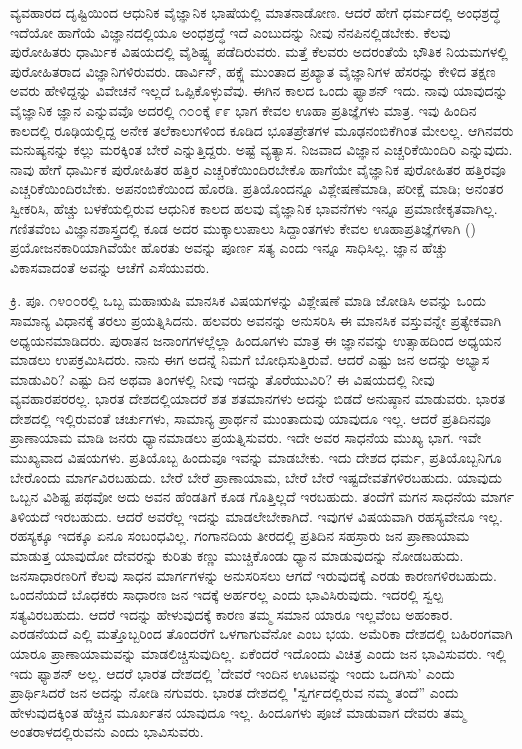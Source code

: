 ವ್ಯವಹಾರದ ದೃಷ್ಟಿಯಿಂದ ಆಧುನಿಕ ವೈಜ್ಞಾನಿಕ ಭಾಷೆಯಲ್ಲಿ ಮಾತನಾಡೋಣ. ಆದರೆ ಹೇಗೆ ಧರ್ಮದಲ್ಲಿ ಅಂಧಶ್ರದ್ಧೆ ಇದೆಯೋ ಹಾಗೆಯೆ ವಿಜ್ಞಾನದಲ್ಲಿಯೂ ಅಂಧಶ್ರದ್ಧೆ ಇದೆ ಎಂಬುದನ್ನು ನೀವು ನೆನಪಿನಲ್ಲಿಡಬೇಕು. ಕೆಲವು ಪುರೋಹಿತರು ಧಾರ್ಮಿಕ ವಿಷಯದಲ್ಲಿ ವೈಶಿಷ್ಟ್ಯ ಪಡೆದಿರುವರು. ಮತ್ತೆ ಕೆಲವರು ಅದರಂತೆಯೆ ಭೌತಿಕ ನಿಯಮಗಳಲ್ಲಿ ಪುರೋಹಿತರಾದ ವಿಜ್ಞಾನಿಗಳಿರುವರು. ಡಾರ್ವಿನ್, ಹಕ್ಸ್ಲೆ ಮುಂತಾದ ಪ್ರಖ್ಯಾತ ವೈಜ್ಞಾನಿಗಳ ಹೆಸರನ್ನು ಕೇಳಿದ ತಕ್ಷಣ ಅವರು ಹೇಳಿದ್ದನ್ನು ವಿವೇಚನೆ ಇಲ್ಲದೆ ಒಪ್ಪಿಕೊಳ್ಳುವೆವು. ಈಗಿನ ಕಾಲದ ಒಂದು ಫ್ಯಾಶನ್ ಇದು. ನಾವು ಯಾವುದನ್ನು ವೈಜ್ಞಾನಿಕ ಜ್ಞಾನ ಎನ್ನುವವೊ ಅದರಲ್ಲಿ ೧೦೦ಕ್ಕೆ ೯೯ ಭಾಗ ಕೇವಲ ಊಹಾ ಪ್ರತಿಜ್ಞೆಗಳು ಮಾತ್ರ. ಇವು ಹಿಂದಿನ ಕಾಲದಲ್ಲಿ ರೂಢಿಯಲ್ಲಿದ್ದ ಅನೇಕ ತಲೆಕಾಲುಗಳಿಂದ ಕೂಡಿದ ಭೂತಪ್ರೇತಗಳ ಮೂಢನಂಬಿಕೆಗಿಂತ ಮೇಲಲ್ಲ. ಆಗಿನವರು ಮನುಷ್ಯನನ್ನು ಕಲ್ಲು ಮರಕ್ಕಿಂತ ಬೇರೆ ಎನ್ನುತ್ತಿದ್ದರು. ಅಷ್ಟೆ ವ್ಯತ್ಯಾಸ. ನಿಜವಾದ ವಿಜ್ಞಾನ ಎಚ್ಚರಿಕೆಯಿಂದಿರಿ ಎನ್ನುವುದು. ನಾವು ಹೇಗೆ ಧಾರ್ಮಿಕ ಪುರೋಹಿತರ ಹತ್ತಿರ ಎಚ್ಚರಿಕೆಯಿಂದಿರಬೇಕೊ ಹಾಗೆಯೇ ವೈಜ್ಞಾನಿಕ ಪುರೋಹಿತರ ಹತ್ತಿರವೂ ಎಚ್ಚರಿಕೆಯಿಂದಿರಬೇಕು. ಅಪನಂಬಿಕೆಯಿಂದ ಹೊರಡಿ. ಪ್ರತಿಯೊಂದನ್ನೂ ವಿಶ್ಲೇಷಣೆಮಾಡಿ, ಪರೀಕ್ಷೆ ಮಾಡಿ; ಅನಂತರ ಸ್ವೀಕರಿಸಿ, ಹೆಚ್ಚು ಬಳಕೆಯಲ್ಲಿರುವ ಆಧುನಿಕ ಕಾಲದ ಹಲವು ವೈಜ್ಞಾನಿಕ ಭಾವನೆಗಳು ಇನ್ನೂ ಪ್ರಮಾಣೀಕೃತವಾಗಿಲ್ಲ. ಗಣಿತವೆಂಬ ವಿಜ್ಞಾನಶಾಸ್ತ್ರದಲ್ಲಿ ಕೂಡ ಅದರ ಮುಕ್ಕಾಲುಪಾಲು ಸಿದ್ದಾಂತಗಳು ಕೇವಲ ಊಹಾಪ್ರತಿಜ್ಞೆಗಳಾಗಿ () ಪ್ರಯೋಜನಕಾರಿಯಾಗಿವೆಯೇ ಹೊರತು ಅವನ್ನು ಪೂರ್ಣ ಸತ್ಯ ಎಂದು ಇನ್ನೂ ಸಾಧಿಸಿಲ್ಲ. ಜ್ಞಾನ ಹೆಚ್ಚು ವಿಕಾಸವಾದಂತೆ ಅವನ್ನು ಆಚೆಗೆ ಎಸೆಯುವರು.

ಕ್ರಿ. ಪೂ. ೧೪೦೦ರಲ್ಲಿ ಒಬ್ಬ ಮಹಾಋಷಿ ಮಾನಸಿಕ ವಿಷಯಗಳನ್ನು ವಿಶ್ಲೇಷಣೆ ಮಾಡಿ ಜೋಡಿಸಿ ಅವನ್ನು ಒಂದು ಸಾಮಾನ್ಯ ವಿಧಾನಕ್ಕೆ ತರಲು ಪ್ರಯತ್ನಿಸಿದನು. ಹಲವರು ಅವನನ್ನು ಅನುಸರಿಸಿ ಈ ಮಾನಸಿಕ ವಸ್ತುವನ್ನೇ ಪ್ರತ್ಯೇಕವಾಗಿ ಅಧ್ಯಯನಮಾಡಿದರು. ಪುರಾತನ ಜನಾಂಗಗಳಲ್ಲೆಲ್ಲಾ ಹಿಂದೂಗಳು ಮಾತ್ರ ಈ ಜ್ಞಾನವನ್ನು ಉತ್ಸಾಹದಿಂದ ಅಧ್ಯಯನ ಮಾಡಲು ಉಪಕ್ರಮಿಸಿದರು. ನಾನು ಈಗ ಅದನ್ನೆ ನಿಮಗೆ ಬೋಧಿಸುತ್ತಿರುವೆ. ಆದರೆ ಎಷ್ಟು ಜನ ಅದನ್ನು ಅಭ್ಯಾಸ ಮಾಡುವಿರಿ? ಎಷ್ಟು ದಿನ ಅಥವಾ ತಿಂಗಳಲ್ಲಿ ನೀವು ಇದನ್ನು ತೊರೆಯುವಿರಿ? ಈ ವಿಷಯದಲ್ಲಿ ನೀವು ವ್ಯವಹಾರಪರರಲ್ಲ. ಭಾರತ ದೇಶದಲ್ಲಿಯಾದರೆ ಶತ ಶತಮಾನಗಳು ಅದನ್ನು ಬಿಡದೆ ಅನುಷ್ಠಾನ ಮಾಡುವರು. ಭಾರತ ದೇಶದಲ್ಲಿ ಇಲ್ಲಿರುವಂತೆ ಚರ್ಚುಗಳು, ಸಾಮಾನ್ಯ ಪ್ರಾರ್ಥನೆ ಮುಂತಾದುವು ಯಾವುದೂ ಇಲ್ಲ. ಆದರೆ ಪ್ರತಿದಿನವೂ ಪ್ರಾಣಾಯಾಮ ಮಾಡಿ ಜನರು ಧ್ಯಾನಮಾಡಲು ಪ್ರಯತ್ನಿಸುವರು. ಇದೇ ಅವರ ಸಾಧನೆಯ ಮುಖ್ಯ ಭಾಗ. ಇವೇ ಮುಖ್ಯವಾದ ವಿಷಯಗಳು. ಪ್ರತಿಯೊಬ್ಬ ಹಿಂದುವೂ ಇವನ್ನು ಮಾಡಬೇಕು. ಇದು ದೇಶದ ಧರ್ಮ, ಪ್ರತಿಯೊಬ್ಬನಿಗೂ ಬೇರೊಂದು ಮಾರ್ಗವಿರಬಹುದು. ಬೇರೆ ಬೇರೆ ಪ್ರಾಣಾಯಾಮ, ಬೇರೆ ಬೇರೆ ಇಷ್ಟದೇವತೆಗಳಿರಬಹುದು. ಯಾವುದು ಒಬ್ಬನ ವಿಶಿಷ್ಟ ಪಥವೋ ಅದು ಅವನ ಹೆಂಡತಿಗೆ ಕೂಡ ಗೊತ್ತಿಲ್ಲದೆ ಇರಬಹುದು. ತಂದೆಗೆ ಮಗನ ಸಾಧನೆಯ ಮಾರ್ಗ ತಿಳಿಯದೆ ಇರಬಹುದು. ಆದರೆ ಅವರೆಲ್ಲ ಇದನ್ನು ಮಾಡಲೇಬೇಕಾಗಿದೆ. ಇವುಗಳ ವಿಷಯವಾಗಿ ರಹಸ್ಯವೇನೂ ಇಲ್ಲ. ರಹಸ್ಯಕ್ಕೂ ಇದಕ್ಕೂ ಏನೂ ಸಂಬಂಧವಿಲ್ಲ. ಗಂಗಾನದಿಯ ತೀರದಲ್ಲಿ ಪ್ರತಿದಿನ ಸಹಸ್ರಾರು ಜನ ಪ್ರಾಣಾಯಾಮ ಮಾಡುತ್ತ ಯಾವುದೋ ದೇವರನ್ನು ಕುರಿತು ಕಣ್ಣು ಮುಚ್ಚಿಕೊಂಡು ಧ್ಯಾನ ಮಾಡುವುದನ್ನು ನೋಡಬಹುದು. ಜನಸಾಧಾರಣರಿಗೆ ಕೆಲವು ಸಾಧನ ಮಾರ್ಗಗಳನ್ನು ಅನುಸರಿಸಲು ಆಗದೆ ಇರುವುದಕ್ಕೆ ಎರಡು ಕಾರಣಗಳಿರಬಹುದು. ಒಂದನೆಯದೆ ಬೊಧಕರು ಸಾಧಾರಣ ಜನ ಇದಕ್ಕೆ ಅರ್ಹರಲ್ಲ ಎಂದು ಭಾವಿಸಿರುವುದು. ಇದರಲ್ಲಿ ಸ್ವಲ್ಪ ಸತ್ಯವಿರಬಹುದು. ಆದರೆ ಇದನ್ನು ಹೇಳುವುದಕ್ಕೆ ಕಾರಣ ತಮ್ಮ ಸಮಾನ ಯಾರೂ ಇಲ್ಲವೆಂಬ ಅಹಂಕಾರ. ಎರಡನೆಯದೆ ಎಲ್ಲಿ ಮತ್ತೊಬ್ಬರಿಂದ ತೊಂದರೆಗೆ ಒಳಗಾಗುವೆನೋ ಎಂಬ ಭಯ. ಅಮೆರಿಕಾ ದೇಶದಲ್ಲಿ ಬಹಿರಂಗವಾಗಿ ಯಾರೂ ಪ್ರಾಣಾಯಾಮವನ್ನು ಮಾಡಲಿಚ್ಚಿಸುವುದಿಲ್ಲ. ಏಕೆಂದರೆ ಇದೊಂದು ವಿಚಿತ್ರ ಎಂದು ಜನ ಭಾವಿಸುವರು. ಇಲ್ಲಿ ಇದು ಫ್ಯಾಶನ್ ಅಲ್ಲ. ಆದರೆ ಭಾರತ ದೇಶದಲ್ಲಿ 'ದೇವರೆ ಇಂದಿನ ಊಟವನ್ನು ಇಂದು ಒದಗಿಸು' ಎಂದು ಪ್ರಾರ್ಥಿಸಿದರೆ ಜನ ಅದನ್ನು ನೋಡಿ ನಗುವರು. ಭಾರತ ದೇಶದಲ್ಲಿ "ಸ್ವರ್ಗದಲ್ಲಿರುವ ನಮ್ಮ ತಂದೆ'' ಎಂದು ಹೇಳುವುದಕ್ಕಿಂತ ಹೆಚ್ಚಿನ ಮೂರ್ಖತನ ಯಾವುದೂ ಇಲ್ಲ. ಹಿಂದೂಗಳು ಪೂಜೆ ಮಾಡುವಾಗ ದೇವರು ತಮ್ಮ ಅಂತರಾಳದಲ್ಲಿರುವನು ಎಂದು ಭಾವಿಸುವರು.

